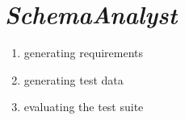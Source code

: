 \section{\textit{SchemaAnalyst}}
\begin{enumerate}
\item generating requirements
\item generating test data
\item evaluating the test suite
\end{enumerate}
